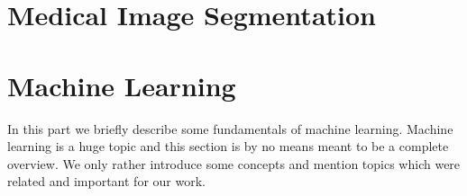 \section{Medical Image Segmentation} \label{sec:intro_mia} %

\section{Machine Learning} \label{sec:intro_mlearn} %
In this part we briefly describe some fundamentals of machine learning. Machine learning is a huge topic and this section is by no means meant to be a complete overview. We only rather introduce some concepts and mention topics which were related and important for our work.

